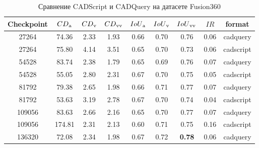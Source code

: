 \begin{table}[]
	\centering
	\caption{Сравнение CADScript и CADQuery на датасете Fusion360}
	\begin{tabular}{ccccccccc}
		\hline
		\textbf{Checkpoint} & $CD\textsubscript{a}$ & $CD\textsubscript{v}$ & $CD\textsubscript{vv}$ & $IoU\textsubscript{a}$ & $IoU\textsubscript{v}$ & $IoU\textsubscript{vv}$ & $IR$          & format    \\
		\hline
		27264               & 74.36                 & 2.33                  & 1.93                   & 0.66                   & 0.70                   & 0.76                    & 0.06          & cadquery  \\
		27264               & 75.80                 & 4.14                  & 3.51                   & 0.65                   & 0.70                   & 0.73                    & 0.06          & cadscript \\
		54528               & 83.74                 & 2.38                  & 1.79                   & 0.65                   & 0.69                   & 0.76                    & 0.07          & cadquery  \\
		54528               & 55.05                 & 2.80                  & 2.31                   & 0.67                   & 0.70                   & 0.75                    & 0.05          & cadscript \\
		81792               & 79.38                 & 2.65                  & 1.98                   & 0.66                   & 0.71                   & 0.77                    & 0.07          & cadquery  \\
		81792               & 53.63                 & 3.19                  & 2.78                   & 0.67                   & 0.70                   & 0.74                    & 0.04          & cadscript \\
		109056              & 83.63                 & 2.66                  & 2.16                   & 0.65                   & 0.70                   & 0.77                    & 0.07          & cadquery  \\
		109056              & 174.81                & 2.31                  & 2.13                   & 0.60                   & 0.71                   & 0.75                    & 0.16          & cadscript \\
		136320              & 72.08                 & 2.34                  & 1.98                   & 0.67                   & 0.72                   & \textbf{0.78}           & 0.06          & cadquery  \\

\end{tabular}
\end{table}
